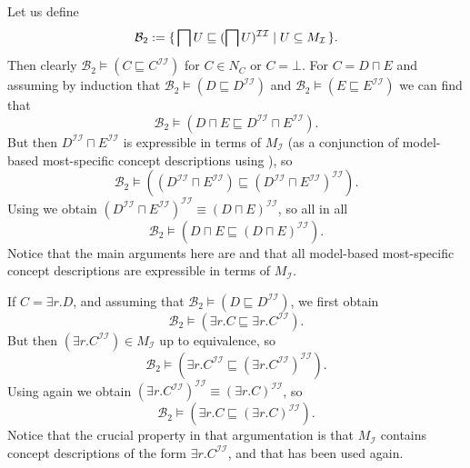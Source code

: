 Let us define
\begin{equation}
  \label{eq:26}
  \mathcal{B}_2 := {\{\, \bigsqcap U \sqsubseteq (\bigsqcap U)^{\mathcal{I}\mathcal{I}}
    \mid U \subseteq M_{\mathcal{I}} \,\}}.
\end{equation}
Then clearly $\mathcal{B}_2 \models (C \sqsubseteq C^{\mathcal{I}\mathcal{I}})$ for $C \in
N_C$ or $C = \bot$.  For $C = D \sqcap E$ and assuming by induction that $\mathcal{B}_2
\models (D \sqsubseteq D^{\mathcal{I}\mathcal{I}})$ and $\mathcal{B}_2 \models (E
\sqsubseteq E^{\mathcal{I}\mathcal{I}})$ we can find that
\begin{equation*}
  \mathcal{B}_2 \models (D \sqcap E \sqsubseteq D^{\mathcal{I}\mathcal{I}} \sqcap E^{\mathcal{I}\mathcal{I}}).
\end{equation*}
But then $D^{\mathcal{I}\mathcal{I}} \sqcap E^{\mathcal{I}\mathcal{I}}$ is expressible in
terms of $M_{\mathcal{I}}$ (as a conjunction of model-based most-specific concept
descriptions using ), so
\begin{equation*}
  \mathcal{B}_2 \models ((D^{\mathcal{I}\mathcal{I}} \sqcap E^{\mathcal{I}\mathcal{I}})
  \sqsubseteq (D^{\mathcal{I}\mathcal{I}} \sqcap E^{\mathcal{I}\mathcal{I}})^{\mathcal{I}\mathcal{I}}).
\end{equation*}
Using  we obtain $(D^{\mathcal{I}\mathcal{I}} \sqcap
E^{\mathcal{I}\mathcal{I}})^{\mathcal{I}\mathcal{I}} \equiv (D \sqcap
E)^{\mathcal{I}\mathcal{I}}$, so all in all
\begin{equation*}
  \mathcal{B}_2 \models (D \sqcap E \sqsubseteq (D \sqcap E)^{\mathcal{I}\mathcal{I}}).
\end{equation*}
Notice that the main arguments here are  and that all
model-based most-specific concept descriptions are expressible in terms of
$M_{\mathcal{I}}$.

If $C = \exists r. D$, and assuming that $\mathcal{B}_2 \models (D \sqsubseteq
D^{\mathcal{I}\mathcal{I}})$, we first obtain
\begin{equation}
  \label{eq:22}
  \mathcal{B}_2 \models ( \exists r. C \sqsubseteq \exists r. C^{\mathcal{I}\mathcal{I}} ).
\end{equation}
But then $(\exists r. C^{\mathcal{I}\mathcal{I}}) \in M_{\mathcal{I}}$ up to equivalence,
so
\begin{equation*}
  \mathcal{B}_2 \models ( \exists r. C^{\mathcal{I}\mathcal{I}} \sqsubseteq (\exists
  r.C^{\mathcal{I}\mathcal{I}})^{\mathcal{I}\mathcal{I}}).  
\end{equation*}
Using  again we obtain $(\exists
r. C^{\mathcal{I}\mathcal{I}})^{\mathcal{I}\mathcal{I}} \equiv (\exists
r. C)^{\mathcal{I}\mathcal{I}}$, so
\begin{equation*}
  \mathcal{B}_2 \models ( \exists r. C \sqsubseteq (\exists r. C)^{\mathcal{I}\mathcal{I}} ).
\end{equation*}
Notice that the crucial property in that argumentation is that $M_{\mathcal{I}}$ contains
concept descriptions of the form $\exists r. C^{\mathcal{I}\mathcal{I}}$, and that
 has been used again.

